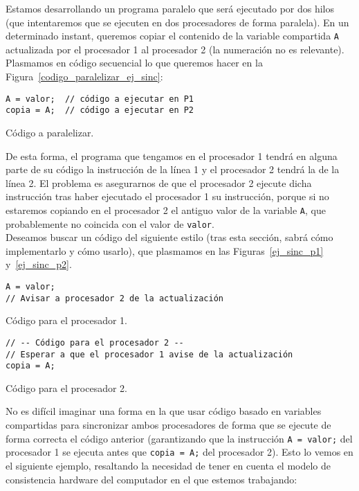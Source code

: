\begin{ejemplo}
    Estamos desarrollando un programa paralelo que será ejecutado por dos hilos (que intentaremos que se ejecuten en dos procesadores de forma paralela). En un determinado instant, queremos copiar el contenido de la variable compartida \verb|A| actualizada por el procesador 1 al procesador 2 (la numeración no es relevante). Plasmamos en código secuencial lo que queremos hacer en la Figura~\ref{codigo_paralelizar_ej_sinc}:
\begin{listing}[H]
\centering
\begin{verbatim}
A = valor;  // código a ejecutar en P1
copia = A;  // código a ejecutar en P2
\end{verbatim}
\caption{Código a paralelizar.}
\label{codigo_paralelizar_ej_sinc}
\end{listing}
De esta forma, el programa que tengamos en el procesador 1 tendrá en alguna parte de su código la instrucción de la línea 1 y el procesador 2 tendrá la de la línea 2. El problema es asegurarnos de que el procesador 2 ejecute dicha instrucción tras haber ejecutado el procesador 1 su instrucción, porque si no estaremos copiando en el procesador 2 el antiguo valor de la variable \verb|A|, que probablemente no coincida con el valor de \verb|valor|.\\

Deseamos buscar un código del siguiente estilo (tras esta sección, sabrá cómo implementarlo y cómo usarlo), que plasmamos en las Figuras~\ref{ej_sinc_p1} y~\ref{ej_sinc_p2}.
\begin{listing}[H]
\centering
\begin{verbatim}
A = valor;
// Avisar a procesador 2 de la actualización
\end{verbatim}
\caption{Código para el procesador 1.}
\label{ej_sinc_p1}
\end{listing}

\begin{listing}[H]
\centering
\begin{verbatim}
// -- Código para el procesador 2 --
// Esperar a que el procesador 1 avise de la actualización
copia = A;
\end{verbatim}
\caption{Código para el procesador 2.}
\label{ej_sinc_p2}
\end{listing}
\end{ejemplo}
No es difícil imaginar una forma en la que usar código basado en variables compartidas para sincronizar ambos procesadores de forma que se ejecute de forma correcta el código anterior (garantizando que la instrucción \verb|A = valor;| del procesador 1 se ejecuta antes que \verb|copia = A;| del procesador 2). Esto lo vemos en el siguiente ejemplo, resaltando la necesidad de tener en cuenta el modelo de consistencia hardware del computador en el que estemos trabajando:
